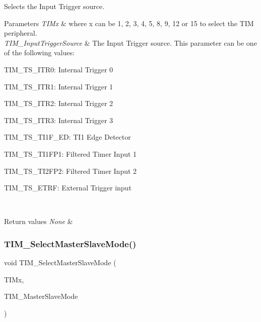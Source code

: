 Selects the Input Trigger source. 


\begin{DoxyParams}{Parameters}
{\em T\+I\+Mx} & where x can be 1, 2, 3, 4, 5, 8, 9, 12 or 15 to select the T\+IM peripheral. \\
\hline
{\em T\+I\+M\+\_\+\+Input\+Trigger\+Source} & The Input Trigger source. This parameter can be one of the following values\+: \begin{DoxyItemize}
\item T\+I\+M\+\_\+\+T\+S\+\_\+\+I\+T\+R0\+: Internal Trigger 0 \item T\+I\+M\+\_\+\+T\+S\+\_\+\+I\+T\+R1\+: Internal Trigger 1 \item T\+I\+M\+\_\+\+T\+S\+\_\+\+I\+T\+R2\+: Internal Trigger 2 \item T\+I\+M\+\_\+\+T\+S\+\_\+\+I\+T\+R3\+: Internal Trigger 3 \item T\+I\+M\+\_\+\+T\+S\+\_\+\+T\+I1\+F\+\_\+\+ED\+: T\+I1 Edge Detector \item T\+I\+M\+\_\+\+T\+S\+\_\+\+T\+I1\+F\+P1\+: Filtered Timer Input 1 \item T\+I\+M\+\_\+\+T\+S\+\_\+\+T\+I2\+F\+P2\+: Filtered Timer Input 2 \item T\+I\+M\+\_\+\+T\+S\+\_\+\+E\+T\+RF\+: External Trigger input \end{DoxyItemize}
\\
\hline
\end{DoxyParams}

\begin{DoxyRetVals}{Return values}
{\em None} & \\
\hline
\end{DoxyRetVals}
\mbox{\label{group___t_i_m___private___functions_ga4dcc3d11b670c381d0ff9cb7e9fd01e2}} 
\subsubsection{\texorpdfstring{TIM\_SelectMasterSlaveMode()}{TIM\_SelectMasterSlaveMode()}}
{\footnotesize\ttfamily void T\+I\+M\+\_\+\+Select\+Master\+Slave\+Mode (\begin{DoxyParamCaption}\item[{\mbox{\hyperlink{struct_t_i_m___type_def}{T\+I\+M\+\_\+\+Type\+Def}} $\ast$}]{T\+I\+Mx,  }\item[{uint16\+\_\+t}]{T\+I\+M\+\_\+\+Master\+Slave\+Mode }\end{DoxyParamCaption})}



